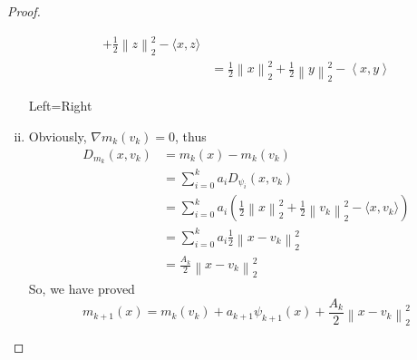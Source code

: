 \documentclass{article}
\begin{document}
\begin{proof}
\begin{enumerate}[(i)]
\begin{align*}
                    +\frac{1}{2}\left\lVert z \right \rVert_2^2
                    -\langle x,z \rangle\\
                &=\frac{1}{2}\left\lVert x \right \rVert_2^2
                +\frac{1}{2}\left\lVert y \right \rVert_2^2
                -\left\langle x,y \right\rangle
            \end{align*}
            \begin{center}
                Left=Right
            \end{center}
            \item Obviously, $\nabla m_k(v_k)=0$, thus
            \begin{align*}
                D_{m_k}(x,v_k)&=m_k(x)-m_k(v_k)\\
                &=\sum_{i=0}^k a_i D_{\psi_i}(x,v_k)\\
                &=\sum_{i=0}^k a_i \left(
                    \frac{1}{2}\left\lVert x \right \rVert_2^2
                    +\frac{1}{2}\left\lVert v_k \right \rVert_2^2
                    -\langle x,v_k \rangle
                    \right)\\
                &=\sum_{i=0}^k a_i \frac{1}{2}\left\lVert x-v_k \right \rVert_2^2\\
                &=\frac{A_k}{2}\left\lVert x-v_k \right \rVert_2^2
            \end{align*}
            So, we have proved
            $$m_{k+1}(x)=m_k(v_k)+a_{k+1}\psi_{k+1}(x)+\frac{A_k}{2}\left\lVert x-v_k \right \rVert_2^2$$
        \end{enumerate}
    \end{proof}


\end{document}
